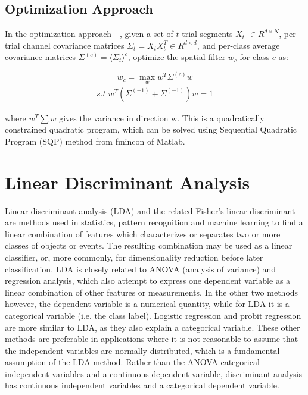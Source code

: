 \subsection{Optimization Approach}

In the optimization approach~\cite{20}~\cite{21}, given a set of $t$ trial segments $X_t$ $\in R^{d \times N}$, per-trial channel covariance matrices $\Sigma_t=X_tX_t^T \in R^{d\times d}$, and per-class average covariance matrices $\Sigma^{\left(c\right)}={\langle \Sigma_t\rangle}^c$, optimize the spatial filter $w_c$ for class $c$ as:

\begin{equation}
w_c= \max _w w^T \Sigma^{\left(c\right)}w 
\end{equation}
\begin{eqnarray*}
s.t \; w^T\left(\Sigma^{\left(+1\right)}+\Sigma^{\left(-1\right)}\right)w=1
\end{eqnarray*}

  

where $w^T\sum w$  gives the variance in direction w. This is a quadratically constrained quadratic program, which can be solved using Sequential Quadratic Program (SQP) method from fmincon of Matlab. 

\section{Linear Discriminant Analysis}
        
Linear discriminant analysis (LDA) and the related Fisher's linear discriminant are methods used in statistics, pattern recognition and machine learning to find a linear combination of features which characterizes or separates two or more classes of objects or events. The resulting combination may be used as a linear classifier, or, more commonly, for dimensionality reduction before later classification. LDA is closely related to ANOVA (analysis of variance) and regression analysis, which also attempt to express one dependent variable as a linear combination of other features or measurements. In the other two methods however, the dependent variable is a numerical quantity, while for LDA it is a categorical variable (i.e. the class label). Logistic regression and probit regression are more similar to LDA, as they also explain a categorical variable. These other methods are preferable in applications where it is not reasonable to assume that the independent variables are normally distributed, which is a fundamental assumption of the LDA method. Rather than the ANOVA categorical independent variables and a continuous dependent variable, discriminant analysis has continuous independent variables and a categorical dependent variable. 


